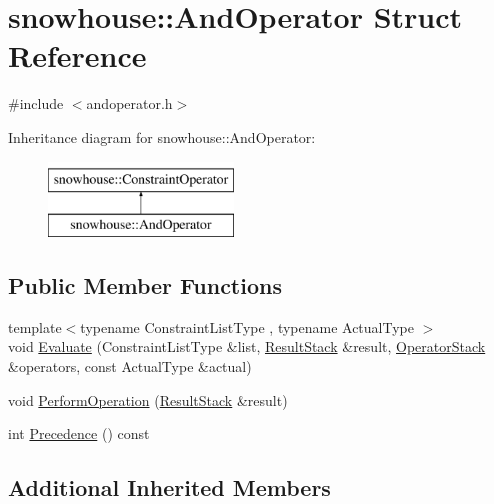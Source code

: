 \hypertarget{structsnowhouse_1_1AndOperator}{}\section{snowhouse\+::And\+Operator Struct Reference}
\label{structsnowhouse_1_1AndOperator}


{\ttfamily \#include $<$andoperator.\+h$>$}

Inheritance diagram for snowhouse\+::And\+Operator\+:\begin{figure}[H]
\begin{center}
\leavevmode
\includegraphics[height=2.000000cm]{structsnowhouse_1_1AndOperator}
\end{center}
\end{figure}
\subsection*{Public Member Functions}
\begin{DoxyCompactItemize}
\item 
{\footnotesize template$<$typename Constraint\+List\+Type , typename Actual\+Type $>$ }\\void \mbox{\hyperlink{structsnowhouse_1_1AndOperator_aed6692968d499216d8bcb8fdbb48445a}{Evaluate}} (Constraint\+List\+Type \&list, \mbox{\hyperlink{namespacesnowhouse_a719169b1315a13161c15f25e600a8f51}{Result\+Stack}} \&result, \mbox{\hyperlink{namespacesnowhouse_adcb10e215e6a4bbcb35722a9c7270fc6}{Operator\+Stack}} \&operators, const Actual\+Type \&actual)
\item 
void \mbox{\hyperlink{structsnowhouse_1_1AndOperator_a59f6a119b0a03df13f7bb99b8fd8ecf9}{Perform\+Operation}} (\mbox{\hyperlink{namespacesnowhouse_a719169b1315a13161c15f25e600a8f51}{Result\+Stack}} \&result)
\item 
int \mbox{\hyperlink{structsnowhouse_1_1AndOperator_a791ad296866bdf103cdb7905de1a3e0e}{Precedence}} () const
\end{DoxyCompactItemize}
\subsection*{Additional Inherited Members}


